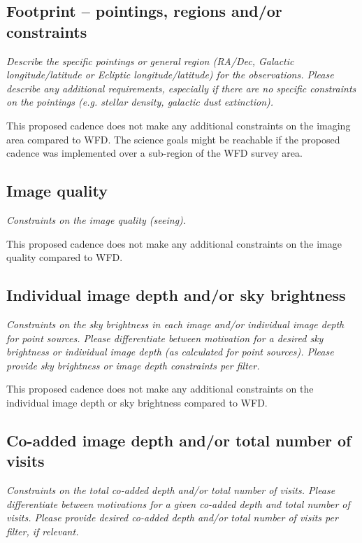 \documentclass[12pt, letterpaper]{article}
\begin{document}
\subsection{Footprint -- pointings, regions and/or constraints}
\begin{footnotesize}{\it Describe the specific pointings or general region (RA/Dec, Galactic longitude/latitude or Ecliptic longitude/latitude) for the observations. Please describe any additional requirements, especially if there are no specific constraints on the pointings (e.g. stellar density, galactic dust extinction).}
\end{footnotesize}

This proposed cadence does not make any additional constraints on the imaging area compared to WFD. The science goals might be reachable if the proposed cadence was implemented over a sub-region of the WFD survey area.  

\subsection{Image quality}
\begin{footnotesize}{\it Constraints on the image quality (seeing).}\end{footnotesize}

This proposed cadence does not make any additional constraints on the image quality compared to WFD. 

\subsection{Individual image depth and/or sky brightness}
\begin{footnotesize}{\it Constraints on the sky brightness in each image and/or individual image depth for point sources. Please differentiate between motivation for a desired sky brightness or individual image depth (as calculated for point sources). Please provide sky brightness or image depth constraints per filter.}
\end{footnotesize}

This proposed cadence does not make any additional constraints on the individual image depth or sky brightness compared to WFD. 


\subsection{Co-added image depth and/or total number of visits}
\begin{footnotesize}{\it  Constraints on the total co-added depth and/or total number of visits. Please differentiate between motivations for a given co-added depth and total number of visits. Please provide desired co-added depth and/or total number of visits per filter, if relevant.}
\end{footnotesize}
\end{document}
